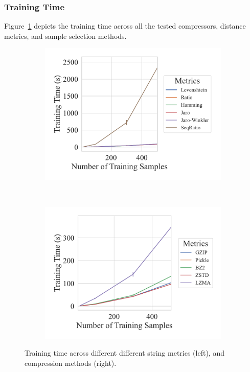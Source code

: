 \subsubsection{Training Time}

Figure~\ref{fig:ddos_training_time} depicts the training time across all the tested compressors, distance metrics, and sample selection methods.

\begin{figure}[h!]
    \centering
    \captionsetup[subfigure]{skip=0pt}
	\begin{subfigure}[t]{.44\textwidth}
		\centering
		\includegraphics[width=\textwidth]{figs/ddos/string_metric_vs_train_time.pdf}
	\end{subfigure}
	~
	\begin{subfigure}[t]{.44\textwidth}
		\centering
		\includegraphics[width=\textwidth]{figs/ddos/compressor_metric_vs_train_time.pdf}
	\end{subfigure}
	\caption{Training time across different different string  metrics (left), and compression methods (right).}
	\label{fig:ddos_training_time}
\end{figure}

